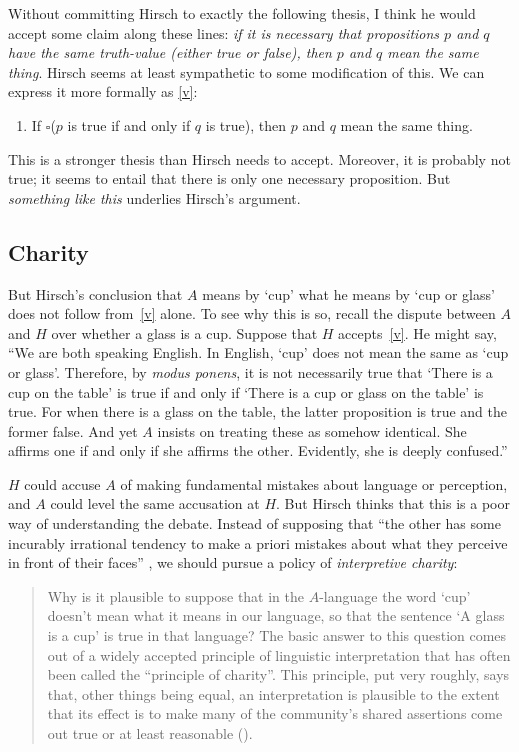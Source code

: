 \documentclass[12pt,twoside]{reedfancy}
\begin{document}
\begin{spacing}{1.25}
Without committing Hirsch to exactly the following thesis, I think he
would accept some claim along these lines: {\em if it is necessary
  that propositions $p$ and $q$ have the same truth-value (either true
  or false), then $p$ and $q$ mean the same thing}.  Hirsch seems at
least sympathetic to some modification of this.  We can express it
more formally as \ref{v}:
\begin{enumerate}[itemindent=25pt, label=(M)]
    \item If $\square$($p$ is true if and only if $q$ is true), then
      $p$ and $q$ mean the same thing. \label{v}
\end{enumerate}

This is a stronger thesis than Hirsch needs to accept.  Moreover, it
is probably not true; it seems to entail that there is only one
necessary proposition.  But {\em something like this} underlies
Hirsch's argument.

\subsection{Charity}
\label{charity}
But Hirsch's conclusion that $A$ means by `cup' what he means by `cup
or glass' does not follow from~\ref{v} alone.  To see why this is so,
recall the dispute between $A$ and $H$ over whether a glass is a cup.
Suppose that $H$ accepts~\ref{v}.  He might say, ``We are both
speaking English.  In English, `cup' does not mean the same as `cup or
glass'. Therefore, by {\em modus ponens}, it is not necessarily true
that `There is a cup on the table' is true if and only if `There is a
cup or glass on the table' is true.  For when there is a glass on the
table, the latter proposition is true and the former false.  And yet
$A$ insists on treating these as somehow identical.  She affirms one
if and only if she affirms the other.  Evidently, she is deeply
confused.''

$H$ could accuse $A$ of making fundamental mistakes about language or
perception, and $A$ could level the same accusation at $H$.  But
Hirsch thinks that this is a poor way of understanding the
debate.  Instead of supposing that ``the other has some incurably
irrational tendency to make a priori mistakes about what they perceive
in front of their faces'' \citep[78]{hirsch2005}, we should pursue a
policy of {\em interpretive charity}:

\begin{quote}
Why is it plausible to suppose that in the $A$-language the word `cup'
doesn't mean what it means in our language, so that the sentence `A
glass is a cup' is true in that language?  The basic answer to this
question comes out of a widely accepted principle of linguistic
interpretation that has often been called the ``principle of
charity''.  This principle, put very roughly, says that, other things
being equal, an interpretation is plausible to the extent that its
effect is to make many of the community's shared assertions come out
true or at least reasonable (\citeyear[71]{hirsch2005}).
\end{quote}


\end{spacing}
\end{document}
